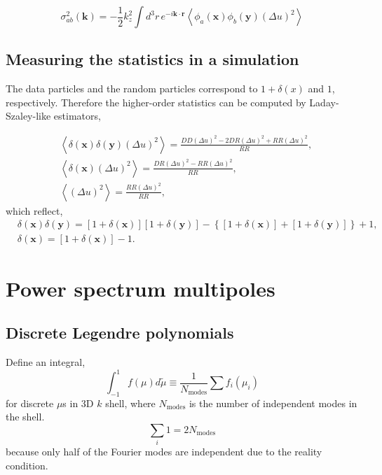 \documentclass[a4paper,11pt, fleqn]{article}
\begin{document}
\begin{equation}
  \sigma_{ab}^2(\bm{k}) = -\frac{1}{2} k_z^2 \int\! d^3 r\,
    e^{-i\bm{k}\cdot\bm{r}} \left\langle
    \phi_a(\bm{x}) \phi_b(\bm{y}) (\Delta u)^2
  \right\rangle
\end{equation}


\subsection{Measuring the statistics in a simulation}

The data particles and the random particles correspond to $1 +
\delta(x)$ and $1$, respectively. Therefore the higher-order statistics
can be computed by Laday-Szaley-like estimators,

\begin{align}
  &\left\langle \delta(\bm{x}) \delta(\bm{y}) (\Delta u)^2 \right\rangle
    = \frac{DD (\Delta u)^2 - 2 DR (\Delta u)^2 + RR (\Delta u)^2}{RR},\\
  &\left\langle \delta(\bm{x}) (\Delta u)^2 \right\rangle
    = \frac{DR (\Delta u)^2 - RR (\Delta u)^2}{RR},\\
  &\left\langle (\Delta u)^2 \right\rangle
    = \frac{RR (\Delta u)^2}{RR},
\end{align}
which reflect,
\begin{align}
  &\delta(\bm{x})\delta(\bm{y})
    = [ 1 + \delta(\bm{x}) ][ 1 + \delta(\bm{y}) ]
      - \left\{ [ 1 + \delta(\bm{x}) ] + [ 1 + \delta(\bm{y}) ] \right\} + 1,\\
  &\delta(\bm{x})
    = [ 1 + \delta(\bm{x}) ] - 1.
\end{align}

\clearpage
\section{Power spectrum multipoles}

\subsection{Discrete Legendre polynomials}

Define an integral,
\begin{equation}
  \int_{-1}^1 f(\mu) d\tilde{\mu} \equiv \frac{1}{N_\mathrm{modes}} \sum f_i(\mu_i)
\end{equation}
for discrete $\mu$s in 3D $k$ shell, where $N_\mathrm{modes}$ is the
number of independent modes in the shell.
\begin{equation}
  \sum_i 1 = 2 N_\mathrm{modes}
\end{equation}
because only half of the Fourier modes are independent due to the
reality condition.\\
\end{document}
